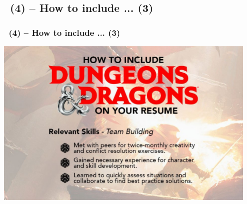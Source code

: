 \documentclass[slidetop,11pt]{beamer}
\begin{document}
\subsection{ \subsectionTtitle~(4) -- How to include ... (3)}
\begin{frame}
	\frametitle{ \subsectionTtitle~(4) -- How to include ... (3)}
	\includegraphics[width=0.95\textwidth]{132926163-fc6cf9bd-b35c-49b3-9366-3df360482e7c.jpg} 
\end{frame}
\end{document}
